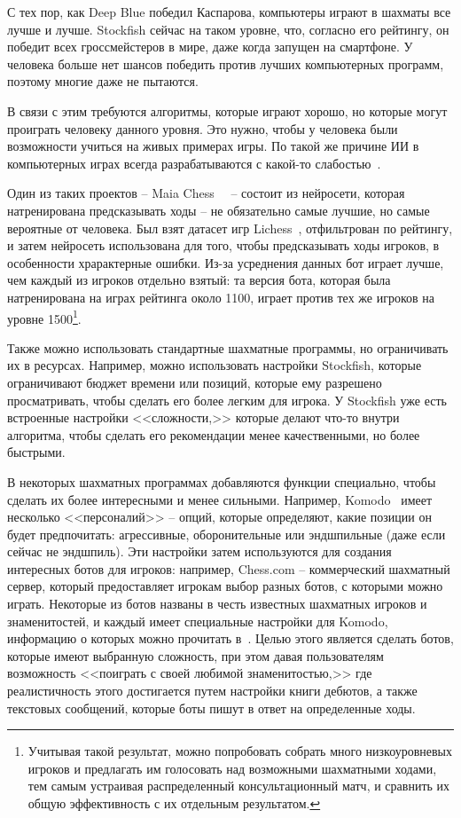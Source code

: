 \documentclass{article}
\begin{document}
С тех пор, как Deep Blue победил Каспарова,
компьютеры играют в шахматы все лучше и лучше.
Stockfish сейчас на таком уровне,
что, согласно его рейтингу,
он победит всех гроссмейстеров в мире,
даже когда запущен на смартфоне.
У человека больше нет шансов победить против лучших компьютерных программ,
поэтому многие даже не пытаются.

В связи с этим требуются алгоритмы,
которые играют хорошо, но которые могут проиграть человеку данного уровня.
Это нужно, чтобы у человека были возможности учиться на живых примерах игры.
По такой же причине ИИ в компьютерных играх всегда разрабатываются
с какой-то слабостью~\cite{gmtk-ai}.

Один из таких проектов -- Maia Chess~\cite{maia-chess-article}~\cite{maia-chess-repo} -- 
состоит из нейросети, которая натренирована предсказывать ходы --
не обязательно самые лучшие, но самые вероятные от человека.
Был взят датасет игр Lichess~\cite{lichess-dataset},
отфильтрован по рейтингу,
и затем нейросеть использована для того, чтобы предсказывать ходы игроков,
в особенности храрактерные ошибки.
Из-за усреднения данных бот играет лучше, чем каждый из игроков отдельно взятый:
та версия бота, которая была натренирована на играх рейтинга около 1100,
играет против тех же игроков на уровне 1500\footnote{
    Учитывая такой результат, можно попробовать собрать много низкоуровневых игроков
    и предлагать им голосовать над возможными шахматными ходами,
    тем самым устраивая распределенный консультационный матч,
    и сравнить их общую эффективность с их отдельным результатом.
}.

Также можно использовать стандартные шахматные программы,
но ограничивать их в ресурсах.
Например, можно использовать настройки Stockfish,
которые ограничивают бюджет времени или позиций,
которые ему разрешено просматривать,
чтобы сделать его более легким для игрока.
У Stockfish уже есть встроенные настройки <<сложности,>>
которые делают что-то внутри алгоритма,
чтобы сделать его рекомендации менее качественными,
но более быстрыми.

В некоторых шахматных программах добавляются функции специально,
чтобы сделать их более интересными и менее сильными.
Например, Komodo~\cite{komodo-engine} имеет несколько <<персоналий>> --
опций, которые определяют, какие позиции он будет предпочитать: агрессивные,
оборонительные или эндшпильные (даже если сейчас не эндшпиль).
Эти настройки затем используются для создания интересных ботов для игроков:
например, Chess.com -- коммерческий шахматный сервер,
который предоставляет игрокам выбор разных ботов, с которыми можно играть.
Некоторые из ботов названы в честь известных шахматных игроков и знаменитостей,
и каждый имеет специальные настройки для Komodo, информацию о которых можно прочитать в~\cite{chesscom-bot-info}.
Целью этого является сделать ботов, которые имеют
выбранную сложность, при этом давая пользователям возможность
<<поиграть с своей любимой знаменитостью,>>
где реалистичность этого достигается путем настройки книги дебютов,
а также текстовых сообщений, которые боты пишут в ответ на определенные ходы.
\end{document}
